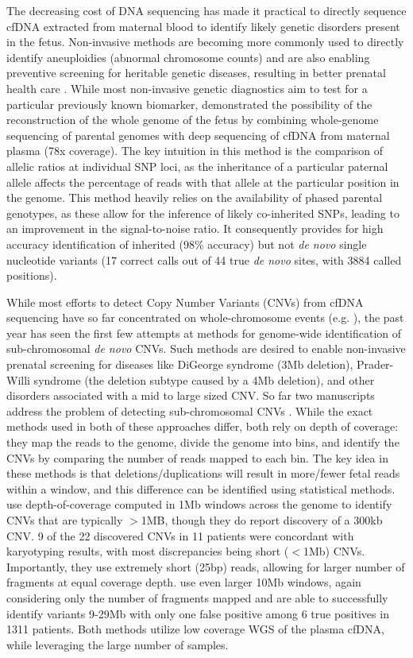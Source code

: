 The decreasing cost of DNA sequencing has made it practical to directly sequence cfDNA extracted from maternal blood to identify likely genetic disorders present in the fetus.  Non-invasive methods are becoming more commonly used to directly identify aneuploidies (abnormal chromosome counts) and are also enabling preventive screening for heritable genetic diseases, resulting in better prenatal health care \citep{saunders2012}.  While most non-invasive genetic diagnostics aim to test for a particular previously known biomarker,  \cite{kitzman2012} demonstrated the possibility of the reconstruction of the whole genome of the fetus by combining whole-genome sequencing of parental genomes with deep sequencing of cfDNA from maternal plasma (78x coverage). The key intuition in this method is the comparison of allelic ratios at individual SNP loci, as the inheritance of a particular paternal allele affects the percentage of reads with that allele at the particular position in the genome.  This method heavily relies on the availability of phased parental genotypes, as these allow for the inference of likely co-inherited SNPs, leading to an improvement in the signal-to-noise ratio. It consequently provides for high accuracy identification of inherited (98\% accuracy) but not \emph{de novo} single nucleotide variants (17 correct calls out of 44 true \textit{de novo} sites, with 3884 called positions).

While most efforts to detect Copy Number Variants (CNVs) from cfDNA sequencing have so far concentrated on whole-chromosome events (e.g. \cite{chu2009}), the past year has seen the first few attempts at methods for genome-wide identification of sub-chromosomal \emph{de novo}  CNVs. Such methods are desired to enable non-invasive prenatal screening for diseases like DiGeorge syndrome (\ntilde3Mb deletion), Prader-Willi syndrome (the deletion subtype caused by a \ntilde4Mb deletion), and other disorders associated with a mid to large sized CNV. So far two manuscripts address the problem of detecting sub-chromosomal CNVs \citep{chen2013, srinivasan2013}. While the exact methods used in both of these approaches differ, both rely on depth of coverage:  they map the reads to the genome, divide the genome into bins, and identify the CNVs by comparing the number of reads mapped to each bin. The key idea in these methods is that deletions/duplications will result in more/fewer fetal reads within a window, and this difference can be identified using statistical methods. \cite{srinivasan2013} use depth-of-coverage computed in 1Mb windows across the genome to identify CNVs that are typically $>$1MB, though they do report discovery of a 300kb CNV. 9 of the 22 discovered CNVs in 11 patients were concordant with karyotyping results, with most discrepancies being short ($<$1Mb) CNVs. Importantly, they use extremely short (25bp) reads, allowing for larger number of fragments at equal coverage depth. \cite{chen2013} use even larger 10Mb windows, again considering only the number of fragments mapped  and are able to successfully identify variants 9-29Mb with only one false positive among 6 true positives in 1311 patients. Both methods utilize low coverage WGS of the plasma cfDNA, while leveraging the large number of samples.

